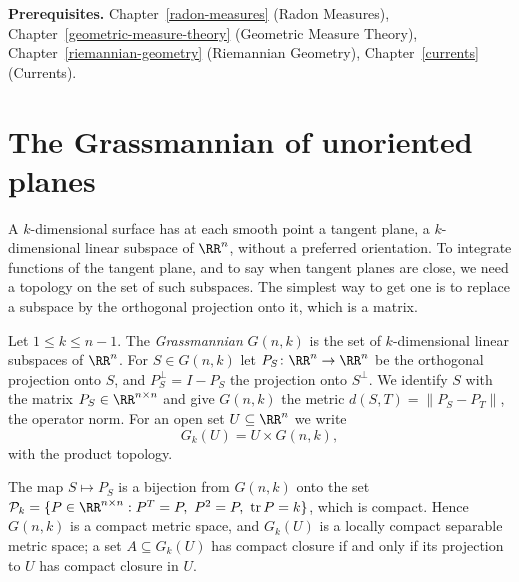 \noindent\textbf{Prerequisites.} Chapter~\ref{radon-measures} (Radon Measures), Chapter~\ref{geometric-measure-theory} (Geometric Measure Theory), Chapter~\ref{riemannian-geometry} (Riemannian Geometry),
Chapter~\ref{currents} (Currents).

\section{The Grassmannian of unoriented planes}\label{varifolds:section-grassmannian}

A $k$-dimensional surface has at each smooth point a tangent plane, a $k$-dimensional linear subspace of $\RR^n$, without a preferred orientation. To integrate functions of the tangent plane, and to say
when tangent planes are close, we need a topology on the set of such subspaces. The simplest way to get one is to replace a subspace by the orthogonal projection onto it, which is a matrix.

\begin{definition}\label{varifolds:definition-grassmannian}
Let $1 \leq k \leq n - 1$. The \emph{Grassmannian} $G(n, k)$ is the set of $k$-dimensional linear subspaces of $\RR^n$. For $S \in G(n, k)$ let $P_S \colon \RR^n \to \RR^n$ be the orthogonal projection onto
$S$, and $P_S^\perp = I - P_S$ the projection onto $S^\perp$. We identify $S$ with the matrix $P_S \in \RR^{n \times n}$ and give $G(n, k)$ the metric $d(S, T) = \|P_S - P_T\|$, the operator norm. For an
open set $U \subseteq \RR^n$ we write
\[
G_k(U) = U \times G(n, k),
\]
with the product topology.
\end{definition}

\begin{lemma}\label{varifolds:lemma-grassmannian-compact}
The map $S \mapsto P_S$ is a bijection from $G(n, k)$ onto the set $\mathcal{P}_k = \{P \in \RR^{n \times n} : P^T = P,\ P^2 = P,\ \operatorname{tr}P = k\}$, which is compact. Hence $G(n, k)$ is a compact metric
space, and $G_k(U)$ is a locally compact separable metric space; a set $A \subseteq G_k(U)$ has compact closure if and only if its projection to $U$ has compact closure in $U$.
\end{lemma}

